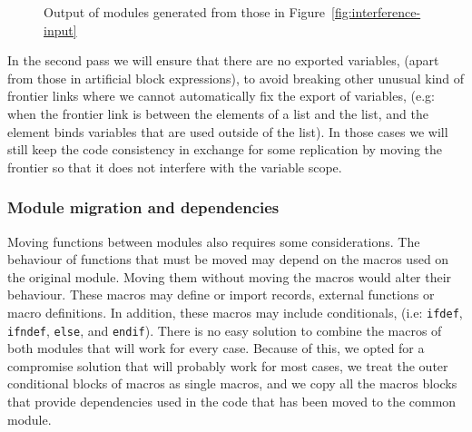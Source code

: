 \begin{figure}
\begin{minipage}[t]{1\textwidth}%
%
\end{minipage}

\begin{minipage}[t]{1\textwidth}%
%
\end{minipage}

\begin{minipage}[t]{1\textwidth}%
%
\end{minipage}
\vspace*{-2.5mm}
\caption{Output of modules generated from those in Figure~\ref{fig:interference-input}\label{fig:interference-output}}
\end{figure}


In the second pass we will ensure that there are no exported variables,
(apart from those in artificial block expressions), to avoid breaking
other unusual kind of frontier links where we cannot automatically fix
the export of variables, (e.g: when the frontier link is between
the elements of a list and the list, and the element binds variables that
are used outside of the list). In those cases we will still keep the code 
consistency in exchange for some replication by moving the frontier so that
it does not interfere with the variable scope.

\subsubsection{Module migration and dependencies}

Moving functions between modules also requires some considerations.
The behaviour of functions that must be moved may depend on the macros
used on the original module. Moving them without moving the macros
would alter their behaviour. These macros may define or import records,
external functions or macro definitions. In addition, these macros
may include conditionals, (i.e: \texttt{ifdef}, \texttt{ifndef}, \texttt{else},
and \texttt{endif}). There is no easy solution to combine the macros
of both modules that will work for every case. Because of this, we
opted for a compromise solution that will probably work for most cases,
we treat the outer conditional blocks of macros as single macros,
and we copy all the macros blocks that provide dependencies used in
the code that has been moved to the common module.

